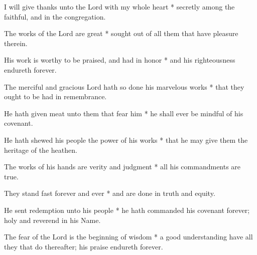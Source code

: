 \begin{multicols}{2}
	
	I will give thanks unto the Lord with my whole heart * secretly among the faithful, and in the congregation.
	
	The works of the Lord are great * sought out of all them that have pleasure therein.
	
	His work is worthy to be praised, and had in honor * and his righteousness endureth forever.
	
	The merciful and gracious Lord hath so done his marvelous works * that they ought to be had in remembrance.
	
	He hath given meat unto them that fear him * he shall ever be mindful of his covenant.
	
	He hath shewed his people the power of his works * that he may give them the heritage of the heathen.
	
	The works of his hands are verity and judgment * all his commandments are true.
	
	They stand fast forever and ever * and are done in truth and equity.
	
	He sent redemption unto his people * he hath commanded his covenant forever; holy and reverend in his Name.
	
	The fear of the Lord is the beginning of wisdom * a good understanding have all they that do thereafter; his praise endureth forever.
	
	\gloria{}
\end{multicols}